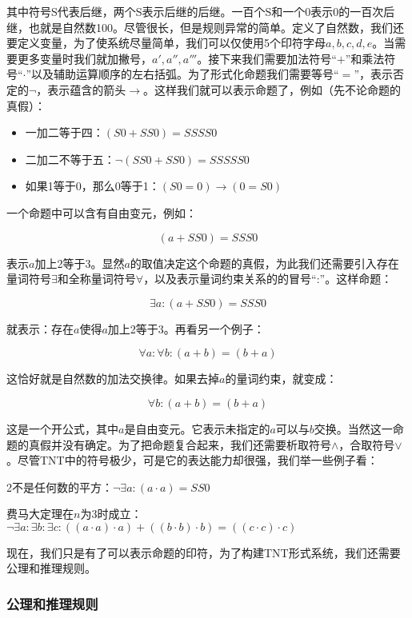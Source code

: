 \documentclass[b5paper]{ctexart}
\begin{document}
其中符号S代表后继，两个S表示后继的后继。一百个S和一个0表示0的一百次后继，也就是自然数100。尽管很长，但是规则异常的简单。定义了自然数，我们还要定义变量，为了使系统尽量简单，我们可以仅使用5个印符字母$a, b, c, d, e$。当需要更多变量时我们就加撇号，$a', a'', a'''$。接下来我们需要加法符号“$+$”和乘法符号“$\cdot$”以及辅助运算顺序的左右括弧。为了形式化命题我们需要等号“$=$”，表示否定的$\lnot$，表示蕴含的箭头$\to$。这样我们就可以表示命题了，例如（先不论命题的真假）：

\begin{itemize}
\item 一加二等于四：$(S0 + SS0) = SSSS0$
\item 二加二不等于五：$\lnot (SS0 + SS0) = SSSSS0$
\item 如果1等于0，那么0等于1：$(S0 = 0) \to (0 = S0)$
\end{itemize}

一个命题中可以含有自由变元，例如：

\[
(a + SS0) = SSS0
\]

表示$a$加上2等于3。显然$a$的取值决定这个命题的真假，为此我们还需要引入存在量词符号$\exists$和全称量词符号$\forall$，以及表示量词约束关系的的冒号“:”。这样命题：

\[
\exists a : (a + SS0) = SSS0
\]

就表示：存在$a$使得$a$加上2等于3。再看另一个例子：

\[
\forall a : \forall b : (a + b) = (b + a)
\]

这恰好就是自然数的加法交换律。如果去掉$a$的量词约束，就变成：

\[
\forall b : (a + b) = (b + a)
\]

这是一个开公式，其中$a$是自由变元。它表示未指定的$a$可以与$b$交换。当然这一命题的真假并没有确定。为了把命题复合起来，我们还需要析取符号$\land$，合取符号$\lor$。尽管TNT中的符号极少，可是它的表达能力却很强，我们举一些例子看：

2不是任何数的平方：$\lnot \exists a : (a \cdot a) = SS0$

费马大定理在$n$为3时成立：$\lnot \exists a : \exists b : \exists c : ((a \cdot a) \cdot a) + ((b \cdot b) \cdot b) = ((c \cdot c) \cdot c)$

现在，我们只是有了可以表示命题的印符，为了构建TNT形式系统，我们还需要公理和推理规则。

\subsubsection{公理和推理规则}
\end{document}
